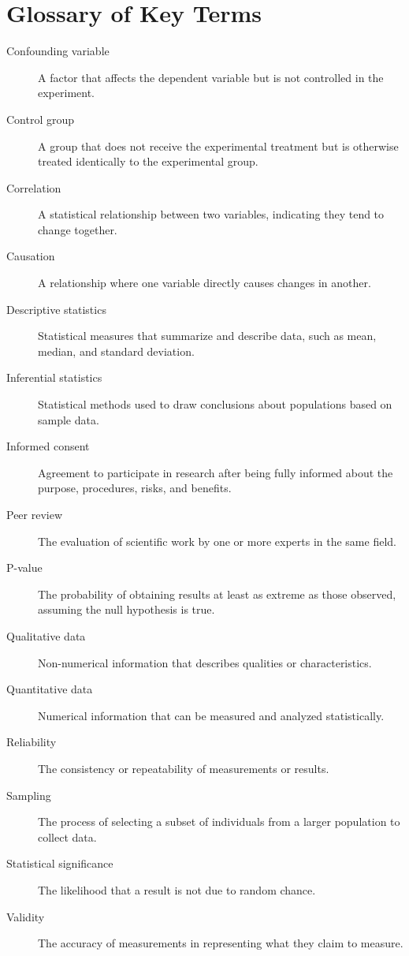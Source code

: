 \documentclass[justified,notoc]{tufte-book}
\begin{document}
\section{Glossary of Key Terms}

\begin{description}
    \item[Confounding variable] A factor that affects the dependent variable but is not controlled in the experiment.
    \item[Control group] A group that does not receive the experimental treatment but is otherwise treated identically to the experimental group.
    \item[Correlation] A statistical relationship between two variables, indicating they tend to change together.
    \item[Causation] A relationship where one variable directly causes changes in another.
    \item[Descriptive statistics] Statistical measures that summarize and describe data, such as mean, median, and standard deviation.
    \item[Inferential statistics] Statistical methods used to draw conclusions about populations based on sample data.
    \item[Informed consent] Agreement to participate in research after being fully informed about the purpose, procedures, risks, and benefits.
    \item[Peer review] The evaluation of scientific work by one or more experts in the same field.
    \item[P-value] The probability of obtaining results at least as extreme as those observed, assuming the null hypothesis is true.
    \item[Qualitative data] Non-numerical information that describes qualities or characteristics.
    \item[Quantitative data] Numerical information that can be measured and analyzed statistically.
    \item[Reliability] The consistency or repeatability of measurements or results.
    \item[Sampling] The process of selecting a subset of individuals from a larger population to collect data.
    \item[Statistical significance] The likelihood that a result is not due to random chance.
    \item[Validity] The accuracy of measurements in representing what they claim to measure.
\end{description}
\end{document}
